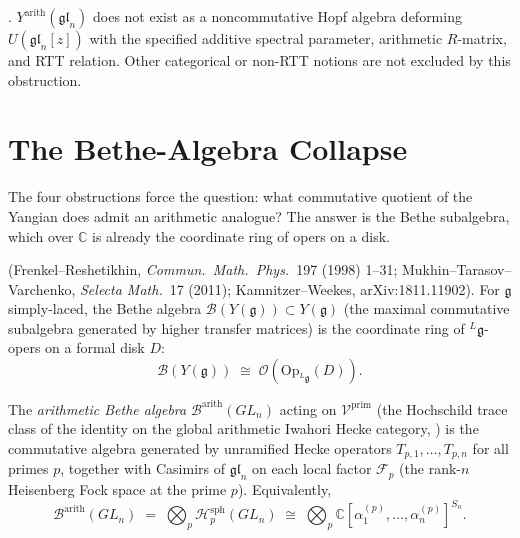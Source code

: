 \begin{corollary}
\label{v4-arith:cor:no-arith-yangian}
\ClaimStatusProvedHere. \(Y^{\mathrm{arith}}(\mathfrak{gl}_{n})\)
does not exist as a noncommutative Hopf algebra deforming
\(U(\mathfrak{gl}_{n}[z])\) with the specified additive spectral
parameter, arithmetic \(R\)-matrix, and RTT relation. Other categorical
or non-RTT notions are not excluded by this obstruction.
\end{corollary}

\section{The Bethe-Algebra Collapse}
\label{v4-arith:dr:bethe-collapse}

The four obstructions force the question: what commutative quotient
of the Yangian does admit an arithmetic analogue?
The answer is the Bethe subalgebra, which over \(\mathbb{C}\) is
already the coordinate ring of opers on a disk.

\begin{theorem}
\label{v4-arith:thm:FR-bethe}
\ClaimStatusProvedElsewhere
(Frenkel--Reshetikhin, \emph{Commun.\ Math.\ Phys.}\ 197 (1998) 1--31;
Mukhin--Tarasov--Varchenko, \emph{Selecta Math.}\ 17 (2011);
Kamnitzer--Weekes, arXiv:1811.11902).
For \(\mathfrak{g}\) simply-laced, the
Bethe algebra \(\mathcal{B}(Y(\mathfrak{g}))\subset Y(\mathfrak{g})\)
(the maximal commutative subalgebra generated by higher transfer
matrices) is the coordinate ring of \(^{L}\mathfrak{g}\)-opers on a
formal disk \(D\):
\begin{equation*}
\mathcal{B}(Y(\mathfrak{g}))\;\cong\;\mathcal{O}(\mathrm{Op}_{^{L}\mathfrak{g}}(D)).
\end{equation*}
\end{theorem}

\begin{definition}
\label{v4-arith:def:arithmetic-bethe}
The \emph{arithmetic Bethe algebra} \(\mathcal{B}^{\mathrm{arith}}(GL_{n})\)
acting on \(\mathcal{V}^{\mathrm{prim}}\) (the Hochschild trace class
of the identity on the global arithmetic Iwahori Hecke category,
) is the commutative algebra
generated by unramified Hecke operators
\(T_{p,1},\ldots,T_{p,n}\) for all primes \(p\), together with Casimirs
of \(\mathfrak{gl}_{n}\) on each local factor \(\mathcal{F}_{p}\)
(the rank-\(n\) Heisenberg Fock space at the prime \(p\)).
Equivalently,
\begin{equation}
\mathcal{B}^{\mathrm{arith}}(GL_{n})\;=\;\bigotimes_{p}\mathcal{H}_{p}^{\mathrm{sph}}(GL_{n})\;\cong\;\bigotimes_{p}\mathbb{C}[\alpha_{1}^{(p)},\ldots,\alpha_{n}^{(p)}]^{S_{n}}.
\end{equation}
\end{definition}

